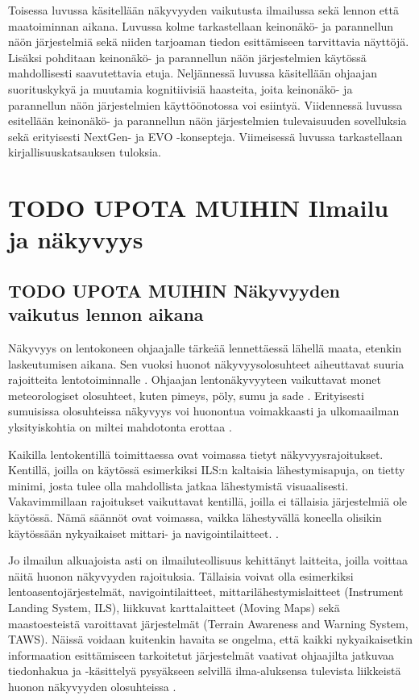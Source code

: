 \documentclass[utf8,bachelor,manualbib]{gradu3}
\begin{document}
Toisessa luvussa käsitellään näkyvyyden vaikutusta ilmailussa sekä lennon että maatoiminnan aikana. Luvussa kolme tarkastellaan keinonäkö- ja parannellun näön järjestelmiä sekä niiden tarjoaman tiedon esittämiseen tarvittavia näyttöjä. Lisäksi pohditaan keinonäkö- ja parannellun näön järjestelmien käytössä mahdollisesti saavutettavia etuja. Neljännessä luvussa käsitellään ohjaajan suorituskykyä ja muutamia kognitiivisiä haasteita, joita keinonäkö- ja parannellun näön järjestelmien käyttöönotossa voi esiintyä. Viidennessä luvussa esitellään keinonäkö- ja parannellun näön järjestelmien tulevaisuuden sovelluksia sekä erityisesti NextGen- ja EVO -konsepteja. Viimeisessä luvussa tarkastellaan kirjallisuuskatsauksen tuloksia.

\chapter{TODO UPOTA MUIHIN Ilmailu ja näkyvyys}

\section{TODO UPOTA MUIHIN Näkyvyyden vaikutus lennon aikana}

Näkyvyys on lentokoneen ohjaajalle tärkeää lennettäessä lähellä maata, etenkin laskeutumisen aikana. Sen vuoksi huonot näkyvyysolosuhteet aiheuttavat suuria rajoitteita lentotoiminnalle \citep{mollersachs1994}. Ohjaajan lentonäkyvyyteen vaikuttavat monet meteorologiset olosuhteet, kuten pimeys, pöly, sumu ja sade \citep{wickensalexander2009}. Erityisesti sumuisissa olosuhteissa näkyvyys voi huonontua voimakkaasti ja ulkomaailman yksityiskohtia on miltei mahdotonta erottaa \citep{beiergemperlein2004}.

Kaikilla lentokentillä toimittaessa ovat voimassa tietyt näkyvyysrajoitukset. Kentillä, joilla on käytössä esimerkiksi ILS:n kaltaisia lähestymisapuja, on tietty minimi, josta tulee olla mahdollista jatkaa lähestymistä visuaalisesti. Vakavimmillaan rajoitukset vaikuttavat kentillä, joilla ei tällaisia järjestelmiä ole käytössä. Nämä säännöt ovat voimassa, vaikka lähestyvällä koneella olisikin käytössään nykyaikaiset mittari- ja navigointilaitteet. \cite{mollersachs1994}.

Jo ilmailun alkuajoista asti on ilmailuteollisuus kehittänyt laitteita, joilla voittaa näitä huonon näkyvyyden rajoituksia. Tällaisia voivat olla esimerkiksi lentoasentojärjestelmät, navigointilaitteet, mittarilähestymislaitteet (Instrument Landing System, ILS), liikkuvat karttalaitteet (Moving Maps) sekä maastoesteistä varoittavat järjestelmät (Terrain Awareness and Warning System, TAWS). Näissä voidaan kuitenkin havaita se ongelma, että kaikki nykyaikaisetkin informaation esittämiseen tarkoitetut järjestelmät vaativat ohjaajilta jatkuvaa tiedonhakua ja -käsittelyä pysyäkseen selvillä ilma-aluksensa tulevista liikkeistä huonon näkyvyyden olosuhteissa \citep {prinzel2004}.
\end{document}
